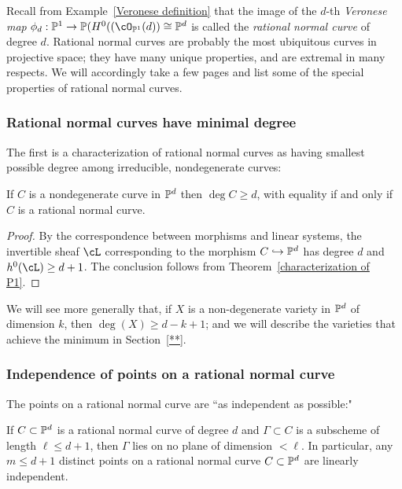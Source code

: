 Recall from Example~\ref{Veronese definition} that the image of the $d$-th \emph{Veronese map}  $\phi_d: \PP^1 \to \PP(H^0((\cO_{\PP^1}(d)) \cong \PP^d$ is called the \emph{rational normal curve} of degree $d$. Rational normal curves are probably the most ubiquitous curves in projective space; they have many unique properties, and are extremal in many respects. We will accordingly take a few pages and list some of the special properties of rational normal curves.

\subsubsection{Rational normal curves have minimal degree}
The first is a characterization of rational normal curves as having smallest possible degree among irreducible, nondegenerate curves:

\begin{proposition}
If $C$ is a nondegenerate curve in $\PP^d$ then $\deg C \geq d$, with equality if and only if $C$ is a  rational normal curve.
\end{proposition}

\begin{proof}
 By the correspondence between morphisms and linear systems, the invertible sheaf $\cL$ corresponding to the morphism $C \hookrightarrow \PP^d$ has degree $d$ and
 $h^0(\cL) \geq d+1$. The conclusion follows from Theorem~\ref{characterization of P1}.
\end{proof}

We will see more generally that, if $X$ is a non-degenerate variety in $\PP^d$ of dimension $k$, then $\deg(X) \geq d-k+1$; and we will describe the varieties that achieve the minimum in Section~\ref{**}.

\subsubsection{Independence of points on a rational normal curve}

The points on a rational normal curve are ``as independent as possible:"

\begin{proposition}
If $C\subset \PP^d$ is a rational normal curve of degree $d$ and $\Gamma\subset C$ is a subscheme of length $\ell \leq d+1$, then
$\Gamma$ lies on no plane of dimension $<\ell$. In particular, any $m \leq d+1$ distinct points on a rational normal curve $C \subset \PP^d$ are linearly independent.
\end{proposition}

